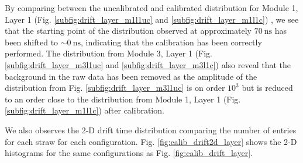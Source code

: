 \documentclass[a4paper]{report}
\numberwithin{equation}{section}
\begin{document}
By comparing between the uncalibrated and calibrated distribution for Module 1, Layer 1 (Fig. \ref{subfig:drift_layer_m1l1uc} and \ref{subfig:drift_layer_m1l1c})
, we see that the starting point of the distribution observed at approximately $\SI{70}{\nano\second}$ has been shifted to $\sim \SI{0}{\nano\second}$, 
indicating that the calibration has been correctly performed. The distribution from Module 3, Layer 1 (Fig. \ref{subfig:drift_layer_m3l1uc}
and \ref{subfig:drift_layer_m3l1c}) also reveal that the background in the raw data has been removed as the amplitude of the distribution 
from Fig. \ref{subfig:drift_layer_m3l1uc} is on order $10^3$ but is reduced to an order close to the distribution from 
Module 1, Layer 1 (Fig. \ref{subfig:drift_layer_m1l1c}) after calibration. \par

We also observes the 2-D drift time distribution comparing the number of entries for each straw for each configuration. Fig. \ref{fig:calib_drift2d_layer} shows the 
2-D histograms for the same configurations as Fig. \ref{fig:calib_drift_layer}. 
\end{document}
